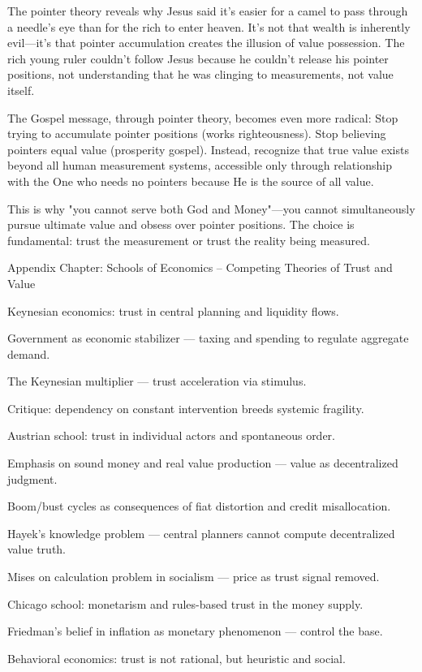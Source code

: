 \documentclass[11pt,oneside]{book}
\begin{document}
The pointer theory reveals why Jesus said it's easier for a camel to pass through a needle's eye than for the rich to enter heaven. It's not that wealth is inherently evil—it's that pointer accumulation creates the illusion of value possession. The rich young ruler couldn't follow Jesus because he couldn't release his pointer positions, not understanding that he was clinging to measurements, not value itself.

The Gospel message, through pointer theory, becomes even more radical: Stop trying to accumulate pointer positions (works righteousness). Stop believing pointers equal value (prosperity gospel). Instead, recognize that true value exists beyond all human measurement systems, accessible only through relationship with the One who needs no pointers because He is the source of all value.

This is why "you cannot serve both God and Money"—you cannot simultaneously pursue ultimate value and obsess over pointer positions. The choice is fundamental: trust the measurement or trust the reality being measured.

Appendix Chapter: Schools of Economics – Competing Theories of Trust and Value

Keynesian economics: trust in central planning and liquidity flows.

Government as economic stabilizer — taxing and spending to regulate aggregate demand.

The Keynesian multiplier — trust acceleration via stimulus.

Critique: dependency on constant intervention breeds systemic fragility.

Austrian school: trust in individual actors and spontaneous order.

Emphasis on sound money and real value production — value as decentralized judgment.

Boom/bust cycles as consequences of fiat distortion and credit misallocation.

Hayek’s knowledge problem — central planners cannot compute decentralized value truth.

Mises on calculation problem in socialism — price as trust signal removed.

Chicago school: monetarism and rules-based trust in the money supply.

Friedman’s belief in inflation as monetary phenomenon — control the base.

Behavioral economics: trust is not rational, but heuristic and social.
\end{document}
